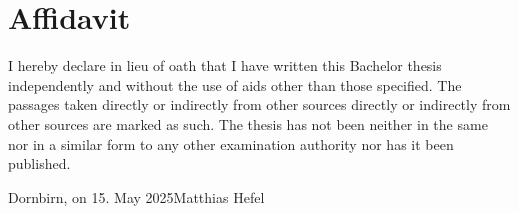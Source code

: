 \documentclass[a4paper,12pt,twoside]{scrreprt}
\begin{document}

\chapter*{Affidavit}
I hereby declare in lieu of oath that I have written this Bachelor
thesis independently and without the use of aids other than those specified.
The passages taken directly or indirectly from other sources
directly or indirectly from other sources are marked as such. The thesis has
not been
neither in the same nor in a similar form to any other examination authority
nor has it been published.

\vspace{3cm}
\noindent
Dornbirn, on 15. May 2025\hfill Matthias Hefel
\end{document}
